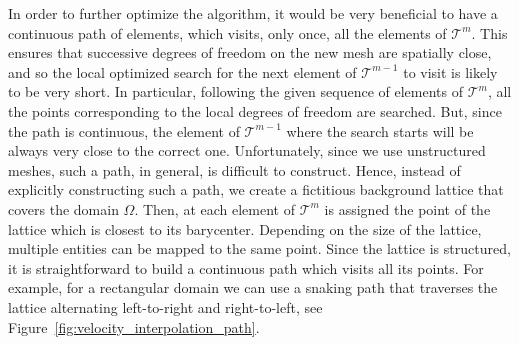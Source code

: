 \documentclass[a4paper,12pt,onecolumn]{article}
\begin{document}
In order to further optimize the algorithm, it would be very beneficial to have
a continuous path of elements, which visits, only once, all the elements of
$\mathcal{T}^m$. This ensures that successive degrees of freedom on the new
mesh are spatially close, and so the local optimized search for the next
element of $\mathcal{T}^{m-1}$ to visit is likely to be very short. In
particular, following the given sequence of elements of $\mathcal{T}^m$,
all the points corresponding to the local degrees of freedom are searched.
But, since the path is continuous, the element of $\mathcal{T}^{m-1}$ where the
search starts will be always very close to the correct one. Unfortunately,
since we use unstructured meshes, such a path, in general, is difficult to
construct. Hence, instead of explicitly constructing such a path, we create a
fictitious background lattice that covers the domain $\Omega$. Then, at each
element of $\mathcal{T}^m$ is assigned the point of the lattice which is
closest to its barycenter. Depending on the size of the lattice, multiple
entities can be mapped to the same point. Since the lattice is structured, it
is straightforward to build a continuous path which visits all its points. For
example, for a rectangular domain we can use a snaking path that traverses the
lattice alternating left-to-right and right-to-left, see
Figure~\ref{fig:velocity_interpolation_path}.
\end{document}
